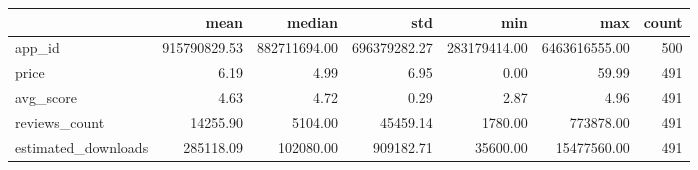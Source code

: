 \begin{tabular}{lrrrrrr}
\toprule
 & mean & median & std & min & max & count \\
\midrule
app_id & 915790829.53 & 882711694.00 & 696379282.27 & 283179414.00 & 6463616555.00 & 500 \\
price & 6.19 & 4.99 & 6.95 & 0.00 & 59.99 & 491 \\
avg_score & 4.63 & 4.72 & 0.29 & 2.87 & 4.96 & 491 \\
reviews_count & 14255.90 & 5104.00 & 45459.14 & 1780.00 & 773878.00 & 491 \\
estimated_downloads & 285118.09 & 102080.00 & 909182.71 & 35600.00 & 15477560.00 & 491 \\
\bottomrule
\end{tabular}
